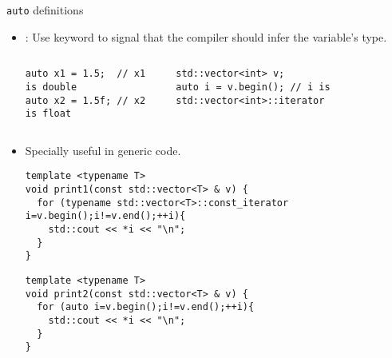 \begin{frame}[t,fragile]{\texttt{auto} definitions}
\begin{itemize}
  \item {}: 
        Use keyword  to signal that the compiler
        should infer the variable's type.
\pause

\begin{columns}[T]
\begin{lstlisting}
auto x1 = 1.5;  // x1 is double
auto x2 = 1.5f; // x2 is float
\end{lstlisting}

\begin{lstlisting}
std::vector<int> v;
auto i = v.begin(); // i is std::vector<int>::iterator
\end{lstlisting}
\end{columns}

\pause
\item Specially useful in generic code.
\begin{lstlisting}[basicstyle=\tiny]
template <typename T>
void print1(const std::vector<T> & v) {
  for (typename std::vector<T>::const_iterator i=v.begin();i!=v.end();++i){
    std::cout << *i << "\n";
  }
}
\end{lstlisting}
\begin{lstlisting}[basicstyle=\tiny]
template <typename T>
void print2(const std::vector<T> & v) {
  for (auto i=v.begin();i!=v.end();++i){
    std::cout << *i << "\n";
  }
}
\end{lstlisting}
\end{itemize}
\end{frame}

